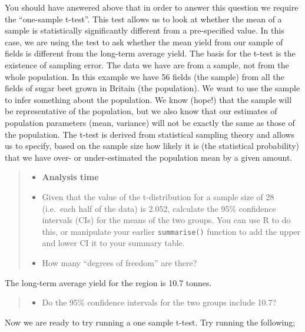 \documentclass[
]{book}
\newenvironment{Shaded}{\begin{snugshade}}{\end{snugshade}}
\newcommand{\AttributeTok}[1]{\textcolor[rgb]{0.13,0.29,0.53}{#1}}
\newcommand{\CommentTok}[1]{\textcolor[rgb]{0.56,0.35,0.01}{\textit{#1}}}
\newcommand{\FloatTok}[1]{\textcolor[rgb]{0.00,0.00,0.81}{#1}}
\newcommand{\FunctionTok}[1]{\textcolor[rgb]{0.13,0.29,0.53}{\textbf{#1}}}
\newcommand{\NormalTok}[1]{#1}
\newcommand{\OtherTok}[1]{\textcolor[rgb]{0.56,0.35,0.01}{#1}}
\newcommand{\SpecialCharTok}[1]{\textcolor[rgb]{0.81,0.36,0.00}{\textbf{#1}}}
\providecommand{\tightlist}{%
  \setlength{\itemsep}{0pt}\setlength{\parskip}{0pt}}
\begin{document}
You should have answered above that in order to answer this question we require the ``one-sample t-test''. This test allows us to look at whether the mean of a sample is statistically significantly different from a pre-specified value. In this case, we are using the test to ask whether the mean yield from our sample of fields is different from the long-term average yield. The basis for the t-test is the existence of sampling error. The data we have are from a sample, not from the whole population. In this example we have 56 fields (the sample) from all the fields of sugar beet grown in Britain (the population). We want to use the sample to infer something about the population. We know (hope!) that the sample will be representative of the population, but we also know that our estimates of population parameters (mean, variance) will not be exactly the same as those of the population. The t-test is derived from statistical sampling theory and allows us to specify, based on the sample size how likely it is (the statistical probability) that we have over- or under-estimated the population mean by a given amount.

\begin{quote}
\begin{itemize}
\tightlist
\item
  \textbf{Analysis time}
\item
  Given that the value of the t-distribution for a sample size of 28 (i.e.~each half of the data) is 2.052, calculate the 95\% confidence intervals (CIs) for the means of the two groups. You can use R to do this, or manipulate your earlier \texttt{summarise()} function to add the upper and lower CI it to your summary table.
\item
  How many ``degrees of freedom'' are there?
\end{itemize}
\end{quote}

The long-term average yield for the region is 10.7 tonnes.

\begin{quote}
\begin{itemize}
\tightlist
\item
  Do the 95\% confidence intervals for the two groups include 10.7?
\end{itemize}
\end{quote}

Now we are ready to try running a one sample t-test. Try running the following;

\begin{Shaded}
\end{Shaded}
\end{document}
